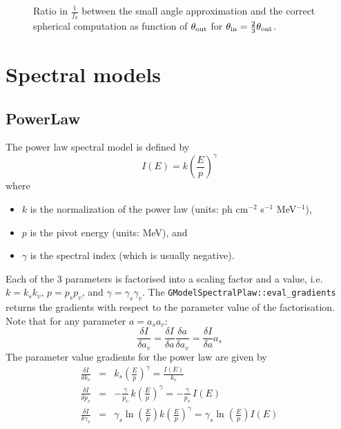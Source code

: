 \documentclass{article}[12pt,a4]
\begin{document}
\begin{figure}
  \center
 \caption{Ratio in $\frac{1}{f_0}$ between the small angle approximation and the correct 
spherical computation as function of $\theta_{\rm out}$ for
$\theta_{\rm in} = \frac{2}{3}\theta_{\rm out}$.}
 \label{fig:shellfunction}
\end{figure}




\section{Spectral models}

\subsection{PowerLaw}

The power law spectral model is defined by
\begin{equation}
I(E) = k \left( \frac{E}{p} \right)^{\gamma}
\end{equation}
where
\begin{itemize}
\item $k$ is the normalization of the power law (units: ph cm$^{-2}$ s$^{-1}$ MeV$^{-1}$),
\item $p$ is the pivot energy (units: MeV), and
\item $\gamma$ is the spectral index (which is usually negative).
\end{itemize}

Each of the 3 parameters is factorised into a scaling factor and a value, i.e.
$k=k_s k_v$, $p=p_s p_v$, and $\gamma = \gamma_s \gamma_v$.
The {\tt GModelSpectralPlaw::eval\_gradients} returns the gradients with
respect to the parameter value of the factorisation.
Note that for any parameter $a=a_s a_v$:
\begin{equation}
\frac{\delta I}{\delta a_v} = \frac{\delta I}{\delta a} \frac{\delta a}{\delta a_v} =
  \frac{\delta I}{\delta a} a_s
\end{equation}
The parameter value gradients for the power law are given by
\begin{eqnarray}
\frac{\delta I}{\delta k_v} & = & 
  k_s \left( \frac{E}{p} \right)^{\gamma} = \frac{I(E)}{k_v} \\
\frac{\delta I}{\delta p_v} & = & 
  -\frac{\gamma}{p_v} \, k \left( \frac{E}{p} \right)^{\gamma} =
  -\frac{\gamma}{p_v} \, I(E) \\
\frac{\delta I}{\delta \gamma_v} & = &
  \gamma_s \ln \left( \frac{E}{p} \right) k \left( \frac{E}{p} \right)^{\gamma} =
  \gamma_s \ln \left( \frac{E}{p} \right) I(E)
\end{eqnarray}
\end{document}
